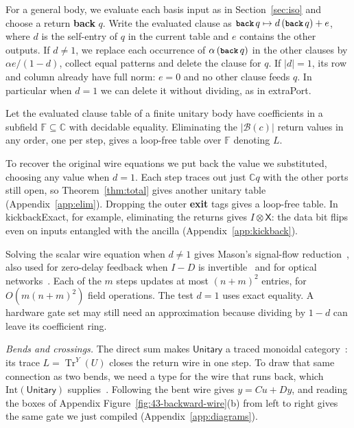\documentclass[acmsmall,screen,review,anonymous,nonacm]{acmart}
\newcommand{\C}{\mathbb C}
\newcommand{\storyinlinekwface}{\storyinlineface\bfseries}}
\newcommand{\storyinlineface}{\small\ttfamily}
\newcommand{\storyinlinekwface}{\small\ttfamily\bfseries}
\newcommand{\kw}[1]{\textnormal{\storyinlinekwface #1}}
\newcommand{\code}[1]{\textnormal{\storyinlineface #1}}
\DeclareMathOperator{\Tr}{Tr}
\numberwithin{equation}{section}
\newcommand{\Int}{\mathrm{Int}}
\begin{document}
For a general body, we evaluate each basis input as in
Section~\ref{sec:iso} and choose a return \kw{back} $q$.
Write the evaluated clause as $\kw{back}\,q\mapsto d\,(\kw{back}\,q)+e$,
where $d$ is the self-entry of $q$ in the current table and $e$ contains
the other outputs. If $d\ne1$, we replace each occurrence of
$\alpha\,(\kw{back}\,q)$ in the other clauses by $\alpha e/(1-d)$,
collect equal patterns and delete the clause for $q$. If $|d|=1$, its row and column already have full norm: $e=0$ and no other clause feeds $q$. In particular when $d=1$ we can delete it without dividing, as in \code{extraPort}.


\begin{proposition}\label{prop:elim}
Let the evaluated clause table of a finite unitary body have coefficients in a subfield
$\mathbb F\subseteq\C$ with decidable equality. Eliminating the $|\mathcal B(c)|$ return
values in any order, one per step, gives a loop-free table over $\mathbb F$ denoting $L$.
\end{proposition}
To recover the original wire equations we put back the value we substituted,
choosing any value when $d=1$. Each step traces out just $\C q$ with the other ports still open, so Theorem~\ref{thm:total} gives another unitary table (Appendix~\ref{app:elim}).
Dropping the outer \kw{exit} tags gives a loop-free table. In \code{kickbackExact},
for example, eliminating the returns gives $I\otimes\mathsf X$: the data bit flips
even on inputs entangled with the ancilla (Appendix~\ref{app:kickback}).

Solving the scalar wire equation when $d\ne1$ gives Mason's signal-flow reduction~\cite[\S\S~3.1--3.2]{Mason53Flow},
also used for zero-delay feedback when $I-D$ is invertible~\cite[Thm.~12, Eq.~(12)]{GoughJames09Feedback}
and for optical networks~\cite[App.~A, Eq.~(A1)]{Tezak12QHDL}.
Each of the $m$ steps updates at most $(n+m)^2$ entries, for $O(m(n+m)^2)$ field operations. The test $d=1$ uses exact equality. A hardware gate set may still need an approximation because dividing by $1-d$ can leave its coefficient ring.


\textit{Bends and crossings.}
The direct sum makes $\mathsf{Unitary}$ a traced monoidal
category~\cite[Cor.~3.3.16]{AndresMartinez22Thesis}: its trace $L=\Tr^Y(U)$ closes the
return wire in one step.
To draw that same connection as two bends, we need a type for the wire that runs back, which
$\Int(\mathsf{Unitary})$ supplies~\cite[\S~4]{JSV96}. Following the bent wire gives $y=Cu+Dy$, and reading
the boxes of Appendix Figure~\ref{fig:43-backward-wire}(b) from left to right gives the same gate
we just compiled (Appendix~\ref{app:diagrams}).
\end{document}
